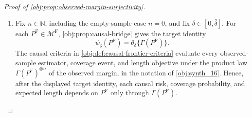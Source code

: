 \begin{proof}[Proof of \cref{obj:prop:observed-margin-surjectivity}]
\begin{enumerate}
On the product space
\[
(\mathcal X\times\mathbb R)\times[0,1],
\qquad
\nu\otimes\lambda_{[0,1]},
\]
define
\[
g_x(a,\upsilon)=\mathfrak q((x,a),\upsilon),
\qquad
Y(a)=g_X(a,U),
\qquad
Y=g_X(A,U).
\]
Because \(K^\star=K^{\mathrm{raw}}\) \(\nu\)-a.e., the law of \((X,A,Y)\) is exactly \(P\).  The displayed structural identities \(Y(a)=g_X(a,U)\) and \(Y=g_X(A,U)\) also give the simultaneous consistency condition in \cref{obj:def:full-data-model-class}.  For bounded Borel \(\varphi:\mathbb R\to\mathbb R\) and \(\chi:[0,1]\to\mathbb R\), the product construction yields, for every \(x\),
\[
p_x
\int_{\{X=x\}}\varphi(A)\chi(U)\,dP^{\mathrm F}
=
\left(\int_{\{X=x\}}\varphi(A)\,dP^{\mathrm F}\right)
\left(\int_{\{X=x\}}\chi(U)\,dP^{\mathrm F}\right),
\]
which is the exchangeability condition in \cref{obj:def:full-data-model-class}.  Finally, for \(a\in[0,\bar\delta]\),
\[
m_x^{\mathrm F}(a)
=
p_x^{-1}\int_{\{X=x\}}g_x(a,U)\,dP^{\mathrm F}
=
\int_0^1\mathfrak q((x,a),\upsilon)\,d\lambda_{[0,1]}(\upsilon)
=
\int y\,K^\star_{(x,a)}(dy)
=
m(x,a)
=
\mu_x^P(a).
\]
Thus \(a\mapsto m_x^{\mathrm F}(a)\) is continuous on \([0,\bar\delta]\).  For the remainder of the proof, write
\[
\Gamma(P^{\mathrm F})
:=
\text{the observed }(X,A,Y)\text{-margin of the full-data law package }P^{\mathrm F}.
\]
The constructed package \(P^{\mathrm F}\) belongs to \(\mathcal M^{\mathrm F}\), and its observed margin is \(P\).  Hence
\[
\forall P\in\mathcal M\quad \exists P^{\mathrm F}\in\mathcal M^{\mathrm F}
\quad\text{with}\quad \Gamma(P^{\mathrm F})=P.
\]
This proves observed-margin surjectivity. %

\item Fix \(n\in\mathbb N\), including the empty-sample case \(n=0\), and fix \(\delta\in[0,\bar\delta]\).  For each \(P^{\mathrm F}\in\mathcal M^{\mathrm F}\), \cref{obj:prop:causal-bridge} gives the target identity
\[
\psi_\delta(P^{\mathrm F})
=
\theta_\delta\{\Gamma(P^{\mathrm F})\}.
\]
The causal criteria in \cref{obj:def:causal-frontier-criteria} evaluate every observed-sample estimator, coverage event, and length objective under the product law \(\Gamma(P^{\mathrm F})^{\otimes n}\) of the observed margin, in the notation of \cref{obj:synth_16}.  Hence, after the displayed target identity, each causal risk, coverage probability, and expected length depends on \(P^{\mathrm F}\) only through \(\Gamma(P^{\mathrm F})\). %


\end{enumerate}
\end{proof}
